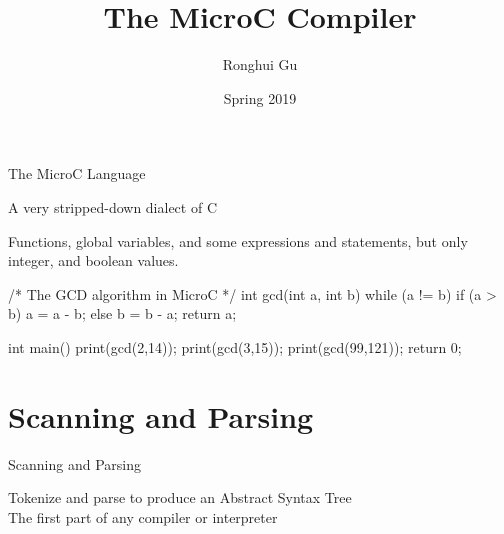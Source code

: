 \documentclass{plt}
\title{The MicroC Compiler}
\author{Ronghui Gu}
\institute{Columbia University}
\date{Spring 2019}
\begin{document}
\frame{\titlepage}


\begin{frame}[fragile=singleslide]{The MicroC Language}

A very stripped-down dialect of C

Functions, global variables, and some expressions and statements, but
only integer, and boolean values.

\begin{C}
/* The GCD algorithm in MicroC */
int gcd(int a, int b) {
  while (a != b) {
    if (a > b) a = a - b;
    else b = b - a;
  }
  return a;
}

int main() {
  print(gcd(2,14));
  print(gcd(3,15));
  print(gcd(99,121));
  return 0;
}
\end{C}

\end{frame}

\part{Scanning and Parsing}

\begin{frame}[fragile,t]{Scanning and Parsing}

\begin{center}
\hspace{20pt}

Tokenize and parse to produce 
an Abstract Syntax Tree \\
\medskip
The first part of any compiler or interpreter
\end{center}
\end{frame}
\end{document}
